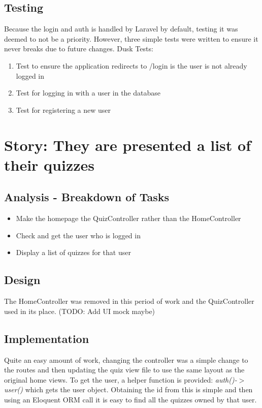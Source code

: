 \documentclass{article}
\begin{document}
\subsection{Testing}
Because the login and auth is handled by Laravel by default, testing it was deemed to not be a priority. However, three simple tests were written to ensure it never breaks due to future changes. Dusk Tests:
\begin{enumerate}
	\item Test to ensure the application redirects to /login is the user is not already logged in
	\item Test for logging in with a user in the database
	\item Test for registering a new user
\end{enumerate}
\newpage

\section{Story: They are presented a list of their quizzes}
\subsection{Analysis - Breakdown of Tasks}
\begin{itemize}
	\item Make the homepage the QuizController rather than the HomeController
	\item Check and get the user who is logged in
	\item Display a list of quizzes for that user
\end{itemize}
\subsection{Design}
The HomeController was removed in this period of work and the QuizController used in its place. (TODO: Add UI mock maybe)
\subsection{Implementation}
Quite an easy amount of work, changing the controller was a simple change to the routes and then updating the quiz view file to use the same layout as the original home views. To get the user, a helper function is provided: \textit{auth()-$>$user()} which gets the user object. Obtaining the id from this is simple and then using an Eloquent ORM call it is easy to find all the quizzes owned by that user.
\end{document}
